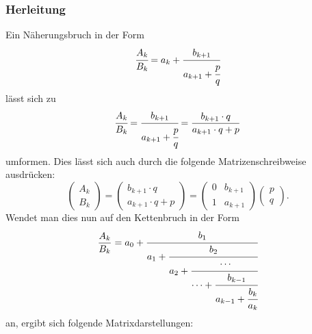 \subsubsection{Herleitung}
Ein Näherungsbruch in der Form
\begin{align*}
	\cfrac{A_k}{B_k} = a_k + \cfrac{b_{k + 1}}{a_{k + 1} + \cfrac{p}{q}}
\end{align*}
lässt sich zu
\begin{align*}
	\cfrac{A_k}{B_k} = \cfrac{b_{k+1}}{a_{k+1} + \cfrac{p}{q}} = \frac{b_{k+1} \cdot q}{a_{k+1} \cdot q + p}
\end{align*}
umformen.
Dies lässt sich auch durch die folgende Matrizenschreibweise ausdrücken:
\begin{equation*}
	\begin{pmatrix}
		A_k\\
		B_k
	\end{pmatrix}
	= 		\begin{pmatrix}
		b_{k+1} \cdot q\\
		a_{k+1} \cdot q + p
	\end{pmatrix}
	=\begin{pmatrix}
		0&	b_{k+1}\\
		1&	a_{k+1}
	\end{pmatrix}
	\begin{pmatrix}
		p \\
		q
	\end{pmatrix}.
\end{equation*}
Wendet man dies nun auf den Kettenbruch in der Form
\begin{equation*}
	\frac{A_k}{B_k} = a_0 + \cfrac{b_1}{a_1+\cfrac{b_2}{a_2+\cfrac{\cdots}{\cdots+\cfrac{b_{k-1}}{a_{k-1} + \cfrac{b_k}{a_k}}}}}
\end{equation*}
an, ergibt sich folgende Matrixdarstellungen:

